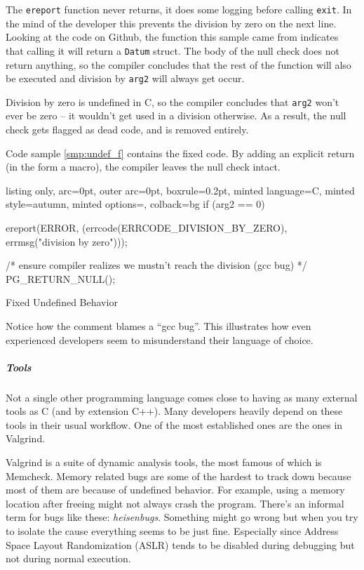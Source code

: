\documentclass[]{article}
\let\oldsubparagraph\subparagraph
\renewcommand{\subparagraph}[1]{\oldsubparagraph{#1}\mbox{}}
\begin{document}
The \texttt{ereport} function never returns, it does some logging before
calling \texttt{exit}. In the mind of the developer this prevents the
division by zero on the next line. Looking at the code on Github, the
function this sample came from indicates that calling it will return a
\texttt{Datum} struct. The body of the null check does not return
anything, so the compiler concludes that the rest of the function will
also be executed and division by \texttt{arg2} will always get occur.

Division by zero is undefined in C, so the compiler concludes that
\texttt{arg2} won't ever be zero -- it wouldn't get used in a division
otherwise. As a result, the null check gets flagged as dead code, and is
removed entirely.

Code sample \ref{smp:undef_f} contains the fixed code. By adding an
explicit return (in the form a macro), the compiler leaves the null
check intact.

\begin{code}
  \begin{tcblisting}{listing only, 
  arc=0pt,
  outer arc=0pt, 
  boxrule=0.2pt,
  minted language=C,
  minted style=autumn,
  minted options={},
  colback=bg }
if (arg2 == 0)
{
  ereport(ERROR,
      (errcode(ERRCODE_DIVISION_BY_ZERO),
       errmsg("division by zero")));

  /* ensure compiler realizes we mustn't reach the division 
  (gcc bug) */
  PG_RETURN_NULL();
}
\end{tcblisting}
\caption{Fixed Undefined Behavior}\label{smp:undef_f}
\end{code}

Notice how the comment blames a ``gcc bug''. This illustrates how even
experienced developers seem to misunderstand their language of choice.

\subparagraph{Tools}\label{tools}

Not a single other programming language comes close to having as many
external tools as C (and by extension C++). Many developers heavily
depend on these tools in their usual workflow. One of the most
established ones are the ones in Valgrind.

Valgrind is a suite of dynamic analysis tools, the most famous of which
is Memcheck. Memory related bugs are some of the hardest to track down
because most of them are because of undefined behavior. For example,
using a memory location after freeing might not always crash the
program. There's an informal term for bugs like these:
\emph{heisenbugs}. Something might go wrong but when you try to isolate
the cause everything seems to be just fine. Especially since Address
Space Layout Randomization (ASLR) tends to be disabled during debugging
but not during normal execution.
\end{document}
